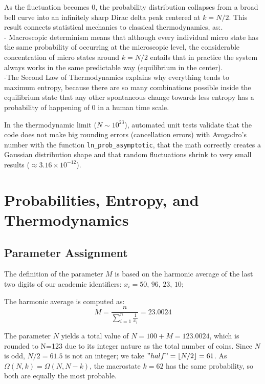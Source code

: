 \documentclass[10pt, a4paper]{article}
\begin{document}
As the fluctuation becomes 0,  the probability distribution collapses from a broad bell curve into an infinitely sharp Dirac delta peak centered at $k = N/2$. This result connects statistical mechanics to classical thermodynamics, as:.\\ 
- Macroscopic determinism means that although every individual micro state has the same probability of occurring at the microscopic level, the considerable concentration of micro states around $k = N/2$ entails that in practice the system always works in the same predictable way (equilibrium in the center).
\\-The Second Law of Thermodynamics explains why everything tends to maximum entropy, because there are so many combinations possible inside the equilibrium state that any other spontaneous change towards less entropy has a probability of happening of 0 in a human time scale.

In the thermodynamic limit ($N \sim 10^{23}$), automated unit tests validate that the code does not make big rounding errors (cancellation errors) with Avogadro's number with the function \texttt{ln_prob_asymptotic}, that the math correctly creates a Gaussian distribution shape and that random fluctuations shrink to very small results  ($\approx 3.16 \times 10^{-12}$). 

\section{Probabilities, Entropy, and Thermodynamics}

\subsection{Parameter Assignment}
The definition of the parameter $M$ is based on the harmonic average of the last two digits of our academic identifiers: $x_i = 50,\,96,\,23,\,10$;

The harmonic average is computed as:
\begin{equation}
M = \frac{n}{\sum_{i=1}^{n} \frac{1}{x_i}} = 23.0024
\end{equation}

The parameter $N$ yields a total value of $N = 100 + M = 123.0024$, which is rounded to N=123 due to its integer nature as the total number of coins.
Since $N$ is odd, $N/2 = 61.5$ is not an integer; we take $"half" = \lfloor N/2 \rfloor = 61$. As $\Omega(N,k) = \Omega(N,N-k)$, the macrostate $k=62$ has the same probability, so both are equally the most probable.
\end{document}
